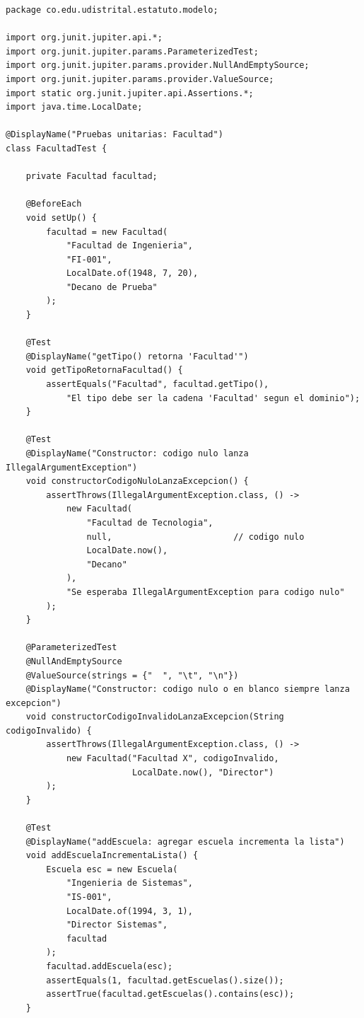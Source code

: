 \begin{lstlisting}[style=javaStyle,
  caption={Clase de prueba \texttt{FacultadTest} con JUnit~5.},
  label={lst:junit-facultad}]
package co.edu.udistrital.estatuto.modelo;

import org.junit.jupiter.api.*;
import org.junit.jupiter.params.ParameterizedTest;
import org.junit.jupiter.params.provider.NullAndEmptySource;
import org.junit.jupiter.params.provider.ValueSource;
import static org.junit.jupiter.api.Assertions.*;
import java.time.LocalDate;

@DisplayName("Pruebas unitarias: Facultad")
class FacultadTest {

    private Facultad facultad;

    @BeforeEach
    void setUp() {
        facultad = new Facultad(
            "Facultad de Ingenieria",
            "FI-001",
            LocalDate.of(1948, 7, 20),
            "Decano de Prueba"
        );
    }

    @Test
    @DisplayName("getTipo() retorna 'Facultad'")
    void getTipoRetornaFacultad() {
        assertEquals("Facultad", facultad.getTipo(),
            "El tipo debe ser la cadena 'Facultad' segun el dominio");
    }

    @Test
    @DisplayName("Constructor: codigo nulo lanza IllegalArgumentException")
    void constructorCodigoNuloLanzaExcepcion() {
        assertThrows(IllegalArgumentException.class, () ->
            new Facultad(
                "Facultad de Tecnologia",
                null,                        // codigo nulo
                LocalDate.now(),
                "Decano"
            ),
            "Se esperaba IllegalArgumentException para codigo nulo"
        );
    }

    @ParameterizedTest
    @NullAndEmptySource
    @ValueSource(strings = {"  ", "\t", "\n"})
    @DisplayName("Constructor: codigo nulo o en blanco siempre lanza excepcion")
    void constructorCodigoInvalidoLanzaExcepcion(String codigoInvalido) {
        assertThrows(IllegalArgumentException.class, () ->
            new Facultad("Facultad X", codigoInvalido,
                         LocalDate.now(), "Director")
        );
    }

    @Test
    @DisplayName("addEscuela: agregar escuela incrementa la lista")
    void addEscuelaIncrementaLista() {
        Escuela esc = new Escuela(
            "Ingenieria de Sistemas",
            "IS-001",
            LocalDate.of(1994, 3, 1),
            "Director Sistemas",
            facultad
        );
        facultad.addEscuela(esc);
        assertEquals(1, facultad.getEscuelas().size());
        assertTrue(facultad.getEscuelas().contains(esc));
    }


\end{lstlisting}
